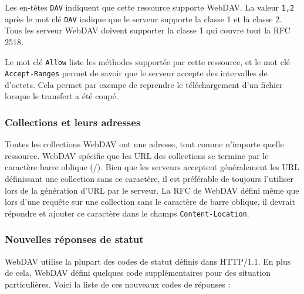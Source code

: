 \documentclass[a4paper, 11pt]{article}
\begin{document}
{			Les en-têtes \texttt{DAV} indiquent que cette ressource supporte WebDAV. La valeur \texttt{1,2} après le mot clé \texttt{DAV} indique que le serveur supporte la classe 1 et la classe 2. Tous les serveur WebDAV doivent supporter la classe 1 qui couvre tout la RFC 2518. 
			
			Le mot clé \texttt{Allow} liste les méthodes supportée par cette ressource, et le mot clé \texttt{Accept-Ranges} permet de savoir que le serveur accepte des intervalles de d'octets. Cela permet par exempe de reprendre le téléchargement d'un fichier lorsque le transfert a été coupé.
			
		\subsubsection{Collections et leurs adresses}
		
			Toutes les collections WebDAV ont une adresse, tout comme n'importe quelle ressource. WebDAV spécifie que les URL des collections se termine par le caractère barre oblique (/). Bien que les serveurs acceptent généralement les URL définissant une collection sans ce caractère, il est préférable de toujours l'utiliser lors de la génération d'URL par le serveur. La RFC de WebDAV défini même que lors d'une requête sur une collection sans le caractère de barre oblique, il devrait répondre et ajouter ce caractère dans le champs \texttt{Content-Location}.
			
		\subsubsection{Nouvelles réponses de statut} %
		
			WebDAV utilise la plupart des codes de statut définis dans HTTP/1.1. En plus de cela, WebDAV défini quelques code supplémentaires pour des situation particulières. Voici la liste de ces nouveaux codes de réponses :
			
}
\end{document}
